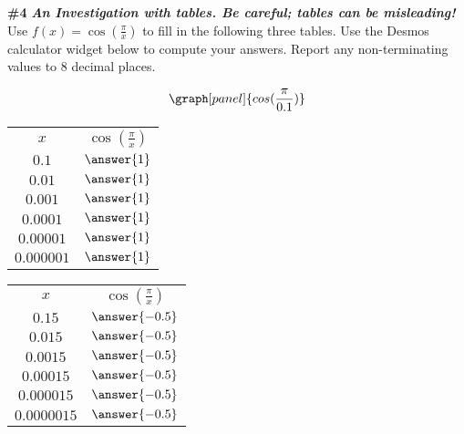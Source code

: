 \documentclass[handout,nooutcomes]{ximera}
\begin{document}
\begin{problem}{\textbf{\#4 }}{\textbf{\textit{An Investigation with tables. Be careful; tables can be misleading! }}}
Use $\displaystyle f(x)=\cos\left(\frac{\pi}{x}\right)$ to fill in the following three tables.
Use the Desmos calculator widget below to compute your answers. Report any non-terminating values to 8 decimal places.

\[
\graph[panel]{cos(\frac{\pi}{0.1})}
\]

\begin{tabular}{|c|c|}

\hline
		$x$ & $\cos\left(\frac{\pi}{x}\right)$\\
		
        $0.1$ & $\answer{1}$\\
		
		$0.01$ & $\answer{1}$\\
		
		$0.001$ & $\answer{1}$\\
		
		$0.0001$ & $\answer{1}$\\
		
		$0.00001$ & $\answer{1}$ \\
		
		$0.000001$ & $\answer{1}$ \\

		
\end{tabular}

\bigskip
\bigskip

\begin{tabular}{|c|c|}

\hline
		$x$ & $\cos\left(\frac{\pi}{x}\right)$\\
		
        $0.15$ & $\answer{-0.5}$\\
		
		$0.015$ & $\answer{-0.5}$\\
		
		$0.0015$ & $\answer{-0.5}$\\
		
		$0.00015$ & $\answer{-0.5}$\\
		
		$0.000015$ & $\answer{-0.5}$ \\
		
		$0.0000015$ & $\answer{-0.5}$ \\

		
\end{tabular}


\end{problem}
\end{document}

